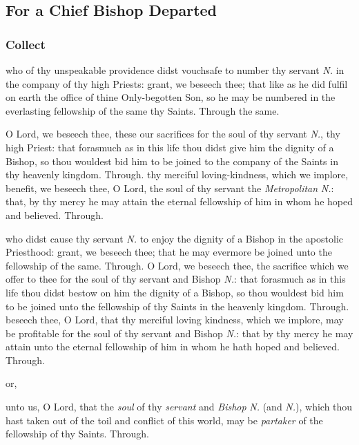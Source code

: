 \begin{multicols}{2}
\subsection{For a Chief Bishop Departed}\label{RequiemPrayers}
\subsubsection{Collect}
 who of thy unspeakable providence didst vouchsafe to number thy servant \textit{N.} in the company of thy high Priests: grant, we beseech thee; that like as he did fulfil on earth the office of thine Only-begotten Son, so he may be numbered in the everlasting fellowship of the same thy Saints. Through the same.

 O Lord, we beseech thee, these our sacrifices for the soul of thy servant \textit{N.}, thy high Priest: that forasmuch as in this life thou didst give him the dignity of a Bishop, so thou wouldest bid him to be joined to the company of the Saints in thy heavenly kingdom. Through.
 thy merciful loving-kindness, which we implore, benefit, we beseech thee, O Lord, the soul of thy servant the \textit{Metropolitan} \textit{N.}: that, by thy mercy he may attain the eternal fellowship of him in whom he hoped and believed. Through.

 who didst cause thy servant \textit{N.} to enjoy the dignity of a Bishop in the apostolic Priesthood: grant, we beseech thee; that he may evermore be joined unto the fellowship of the same. Through.
 O Lord, we beseech thee, the sacrifice which we offer to thee for the soul of thy servant and Bishop \textit{N.}: that forasmuch as in this life thou didst bestow on him the dignity of a Bishop, so thou wouldest bid him to be joined unto the fellowship of thy Saints in the heavenly kingdom. Through.
 beseech thee, O Lord, that thy merciful loving kindness, which we implore, may be profitable for the soul of thy servant and Bishop \textit{N.}: that by thy mercy he may attain unto the eternal fellowship of him in whom he hath hoped and believed. Through.
\begin{inhead}
or,
\end{inhead}
\vspace{-1\baselineskip}
 unto us, O Lord, that the \textit{soul} of thy \textit{servant} and \textit{Bishop} \textit{N.} (and \textit{N.}), which thou hast taken out of the toil and conflict of this world, may be \textit{partaker} of the fellowship of thy Saints. Through.


\end{multicols}
